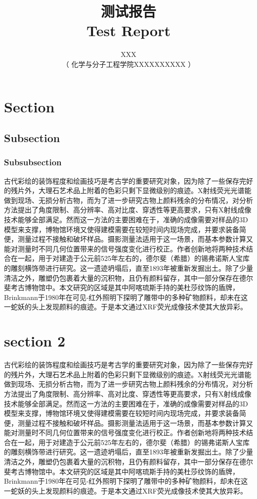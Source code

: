 \documentclass{reptemplate}
\title{
    {\heiti 测试报告}\\%
    {\fontspec{Arial} Test Report}\\%
}
\author{
    XXX\\%
    （ 化学与分子工程学院\qquad XXXXXXXXXX ）%
}
\date{}
\begin{document}
    \maketitle
    \section{Section}
    \subsection{Subsection}
    \subsubsection{Subsubsection}
    古代彩绘的装饰程度和绘画技巧是考古学的重要研究对象，因为除了一些保存完好的残片外，大理石艺术品上附着的色彩只剩下显微级别的痕迹。X射线荧光光谱能做到现场、无损分析古物，而为了进一步研究古物上颜料残余的分布情况，对分析方法提出了角度限制、高分辨率、高对比度、穿透性等更高要求，只有X射线成像技术能够全部满足。然而这一方法的主要困难在于，准确的成像需要对样品的3D模型来支撑，博物馆环境又使得建模需要在较短时间内现场完成，并要求装备简便，测量过程不接触和破坏样品。摄影测量法适用于这一场景，而基本参数计算又能对测量时不同几何位置带来的信号强度变化进行校正。作者创新地将两种技术结合在一起，用于对建造于公元前525年左右的，德尔斐（希腊）的锡弗诺斯人宝库的雕刻横饰带进行研究。这一遗迹坍塌后，直至1893年被重新发掘出土。除了少量清洁之外，雕塑仍包裹着大量的沉积物，且仍有颜料留存，其中一部分保存在德尔斐考古博物馆中。本文研究的区域是其中阿喀琉斯手持的美杜莎纹饰的盾牌，Brinkmann于1980年在可见-红外照明下探明了雕带中的多种矿物颜料，却未在这一蛇妖的头上发现颜料的痕迹。于是本文通过XRF荧光成像技术使其大放异彩。
    \clearpage
    \section{section 2}
    古代彩绘的装饰程度和绘画技巧是考古学的重要研究对象，因为除了一些保存完好的残片外，大理石艺术品上附着的色彩只剩下显微级别的痕迹。X射线荧光光谱能做到现场、无损分析古物，而为了进一步研究古物上颜料残余的分布情况，对分析方法提出了角度限制、高分辨率、高对比度、穿透性等更高要求，只有X射线成像技术能够全部满足。然而这一方法的主要困难在于，准确的成像需要对样品的3D模型来支撑，博物馆环境又使得建模需要在较短时间内现场完成，并要求装备简便，测量过程不接触和破坏样品。摄影测量法适用于这一场景，而基本参数计算又能对测量时不同几何位置带来的信号强度变化进行校正。作者创新地将两种技术结合在一起，用于对建造于公元前525年左右的，德尔斐（希腊）的锡弗诺斯人宝库的雕刻横饰带进行研究。这一遗迹坍塌后，直至1893年被重新发掘出土。除了少量清洁之外，雕塑仍包裹着大量的沉积物，且仍有颜料留存，其中一部分保存在德尔斐考古博物馆中。本文研究的区域是其中阿喀琉斯手持的美杜莎纹饰的盾牌，Brinkmann于1980年在可见-红外照明下探明了雕带中的多种矿物颜料，却未在这一蛇妖的头上发现颜料的痕迹。于是本文通过XRF荧光成像技术使其大放异彩。
\end{document}
